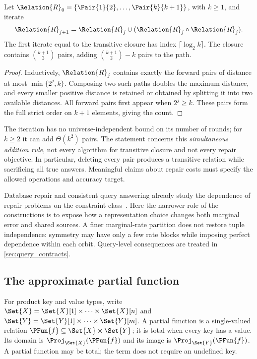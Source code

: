 \documentclass[ ../main.tex]{subfiles}
\begin{document}
\begin{theorem}
\label{thm:transitivity_cascade}
Let $\Relation{R}_0=\{\Pair{1}{2},\ldots,\Pair{k}{k+1}\}$, with $k\ge1$,
and iterate
\begin{equation}
 \Relation{R}_{j+1}=\Relation{R}_j\cup(\Relation{R}_j\circ\Relation{R}_j).
\end{equation}
The first iterate equal to the transitive closure has index
$\lceil\log_2k\rceil$. The closure contains $\binom{k+1}{2}$ pairs, adding
$\binom{k+1}{2}-k$ pairs to the path.
\end{theorem}
\begin{proof}
Inductively, $\Relation{R}_j$ contains exactly the forward pairs of distance at
most $\min\{2^j,k\}$. Composing two such paths doubles the maximum distance,
and every smaller positive distance is retained or obtained by splitting it
into two available distances. All forward pairs first appear when $2^j\ge k$.
These pairs form the full strict order on $k+1$ elements, giving the count.
\end{proof}

The iteration has no universe-independent bound on its number of rounds; for
$k\ge2$ it can add $\Theta(k^2)$ pairs. The statement concerns this
\emph{simultaneous addition rule}, not every algorithm for transitive closure
and not every repair objective. In particular, deleting every pair produces a
transitive relation while sacrificing all true answers. Meaningful claims
about repair costs must specify the allowed operations and accuracy target.

Database repair and consistent query answering already study the dependence
of repair problems on the constraint class~\cite{bertossi-2011-repairing}.
Here the narrower role of the constructions is to expose how a representation
choice changes both marginal error and shared sources. A finer marginal-rate
partition does not restore tuple independence: symmetry may have only a few
rate blocks while imposing perfect dependence within each orbit. Query-level
consequences are treated in \cref{sec:query_contracts}.

\subsection{The approximate partial function}
\label{sec:map}
For product key and value types, write
$\Set{X}=\Set{X}[1]\times\cdots\times\Set{X}[n]$ and
$\Set{Y}=\Set{Y}[1]\times\cdots\times\Set{Y}[m]$. A partial function is a
single-valued relation $\PFun{f}\subseteq\Set{X}\times\Set{Y}$; it is total
when every key has a value. Its domain is $\Proj_{\Set{X}}(\PFun{f})$ and its
image is $\Proj_{\Set{Y}}(\PFun{f})$. A partial function may be total; the
term does not require an undefined key.
\end{document}
